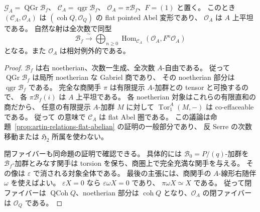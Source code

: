 \begin{lemma}[商圏の平坦性と全次数の飽和]
\label{lem:quadric-first-order-flat-saturated}
$\mathcal G_A=\operatorname{QGr}\mathcal B_f$、
$\mathcal C_A=\operatorname{qgr}\mathcal B_f$、
$\mathcal O_A=\pi\mathcal B_f$、$F=(1)$ と置く。
このとき $(\mathcal C_A,\mathcal O_A)$ は
$(\operatorname{coh}Q,\mathcal O_Q)$ の flat pointed Abel 変形であり、
$\mathcal O_A$ は $A$ 上平坦である。
自然な射は全次数で同型
\[
 \mathcal B_f\xrightarrow{\ \sim\ }
 \bigoplus_{n\ge0}\operatorname{Hom}_{\mathcal C_A}
       (\mathcal O_A,F^n\mathcal O_A)
\]
となる。また $\mathcal O_A$ は相対例外的である。
\end{lemma}
\begin{proof}
$\mathcal B_f$ は右 noetherian、次数一生成、全次数 $A$-自由である。
従って $\operatorname{QGr}\mathcal B_f$ は局所 noetherian な Gabriel 商であり、
その noetherian 部分は $\operatorname{qgr}\mathcal B_f$ である。
完全な商関手 $\pi$ は有限提示 $A$-加群との tensor と可換するので、
各 $\pi\mathcal B_f(i)$ は $A$ 上平坦である。
各 noetherian 対象はこれらの有限直和の商だから、
任意の有限提示 $A$-加群 $M$ に対して
$\operatorname{Tor}^A_1(M,-)$ は co-effaceable である。
従って \cite[Proposition 3.1, Definition 3.2]{LowenVanDenBergh2006}
の意味で $\mathcal C_A$ は flat Abel 圏である。
この議論は命題~\ref{prop:artin-relations-flat-abelian} の証明の一般部分であり、
反 Serre の次数移動または $\mathfrak H_2$ 所属を使わない。

閉ファイバーも同命題の証明で確認できる。
具体的には $\mathcal B_0=P/(q)$-加群を $\mathcal B_f$-加群とみなす関手は
torsion を保ち、商圏上で完全充満な関手を与える。
その像は $\varepsilon$ で消される対象全体である。
最後の主張には、商関手の $A$-線形右随伴 $\omega$ を使えばよい。
$\varepsilon X=0$ なら $\varepsilon\omega X=0$ であり、
$\pi\omega X\simeq X$ である。
従って閉ファイバーは $\operatorname{QCoh}Q$、noetherian 部分は
$\operatorname{coh}Q$ となり、$\mathcal O_A$ の閉ファイバーは $\mathcal O_Q$ である。


\end{proof}
